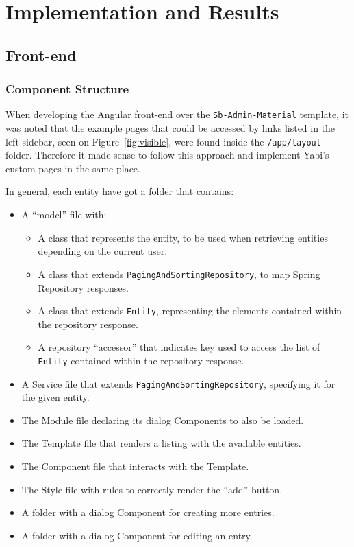 \chapter{Implementation and Results}\label{cha:implementation}

\section{Front-end}\label{cha:implementation:sec:front-end}

\subsection{Component Structure}
When developing the Angular front-end over the \texttt{Sb-Admin-Material} template, it was noted that the example pages that could be accessed by links listed in the left sidebar, seen on Figure~\ref{fig:visible}, were found inside the \texttt{/app/layout} folder. Therefore it made sense to follow this approach and implement \gls{Yabi}'s custom pages in the same place.

In general, each entity have got a folder that contains:
\begin{itemize}
\item A ``model'' file with:
  \begin{itemize}
  \item A class that represents the entity, to be used when retrieving entities depending on the current user.
  \item A class that extends \texttt{PagingAndSortingRepository}, to map Spring Repository responses.
  \item A class that extends \texttt{Entity}, representing the elements contained within the repository response.
  \item A repository ``accessor'' that indicates key used to access the list of \texttt{Entity} contained within the repository response.
  \end{itemize}
\item A Service file that extends \texttt{PagingAndSortingRepository}, specifying it for the given entity.
\item The Module file declaring its dialog Components to also be loaded.
\item The Template file that renders a listing with the available entities.
\item The Component file that interacts with the Template.
\item The Style file with rules to correctly render the ``add'' button.
\item A folder with a dialog Component for creating more entries.
\item A folder with a dialog Component for editing an entry.
\end{itemize}

